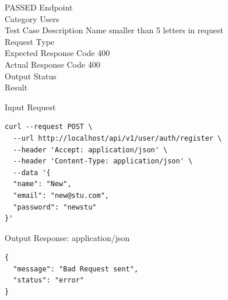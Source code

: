 \begin{testcase}{53}{PASSED}
Endpoint \hfill {}\\
Category \hfill Users\\
Test Case Description \hfill Name smaller than 5 letters in request\\

Request Type    \hfill {}\\
Expected Response Code    \hfill 400\\
Actual Response Code    \hfill 400\\

Output Status \hfill {}\\
Result \hfill {}

\begin{ipblock}{Input Request}
\begin{verbatim}
curl --request POST \
  --url http://localhost/api/v1/user/auth/register \
  --header 'Accept: application/json' \
  --header 'Content-Type: application/json' \
  --data '{
  "name": "New",
  "email": "new@stu.com",
  "password": "newstu"
}'
\end{verbatim}
\end{ipblock}

\begin{opblock}{Output Response: application/json}
\begin{verbatim}
{
  "message": "Bad Request sent",
  "status": "error"
}
\end{verbatim}
\end{opblock}
\end{testcase}

